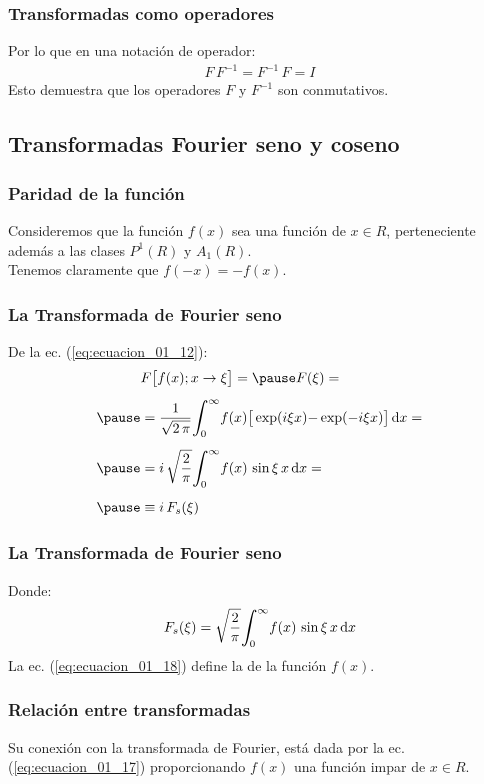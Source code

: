 \begin{frame}
\frametitle{Transformadas como operadores}    
Por lo que en una notación de operador:
\pause
\begin{align*}
F \, F^{-1} = F^{-1} \, F = I
\end{align*}
\pause
Esto demuestra que los operadores $F$ y $F^{-1}$ son conmutativos.
\end{frame}

\subsection{Transformadas Fourier seno y coseno}

\begin{frame}
\frametitle{Paridad de la función}
Consideremos que la función $f (x)$ sea una función  de $x \in R$, perteneciente además a las clases $P^{1} (R)$ y $A_{1} (R)$.
\\
\bigskip
\pause
Tenemos claramente que $f (-x) = - f (x)$. 
\end{frame}
\begin{frame}
\frametitle{La Transformada de Fourier seno}
De la ec. (\ref{eq:ecuacion_01_12}):
\pause
\begin{eqnarray}
\begin{aligned}[b]
&F \big[ f (x); x \to \xi \big] = \pause F (\xi) = \\[0.5em] \pause
&= \dfrac{1}{\sqrt{2 \, \pi}} \scaleint{6ex}_{\bs 0}^{\infty} f (x) \big[ \exp(i \xi x) {-} \exp(-i \xi x) \big] \dd{x} = \\[0.5em] \pause
&= i \, \sqrt{\dfrac{2}{\pi}} \scaleint{6ex}_{\bs 0}^{\infty} f (x) \, \sin \xi \, x \dd{x} = \\[0.5em] \pause
&\equiv i \, F_{s} (\xi)
\end{aligned}
\label{eq:ecuacion_01_17}
\end{eqnarray}
\end{frame}
\begin{frame}
\frametitle{La Transformada de Fourier seno}
Donde:
\pause
\begin{align}
F_{s} (\xi) = \sqrt{\dfrac{2}{\pi}} \scaleint{6ex}_{\bs 0}^{\infty} f (x) \, \sin \xi \, x \dd{x}
\label{eq:ecuacion_01_18}
\end{align}
La ec. (\ref{eq:ecuacion_01_18}) define la  de la función $f (x)$.
\end{frame}
\begin{frame}
\frametitle{Relación entre transformadas}
Su conexión con la transformada de Fourier, está dada por la ec. (\ref{eq:ecuacion_01_17}) proporcionando $f (x)$ una función impar de $x \in R$.
\end{frame}
